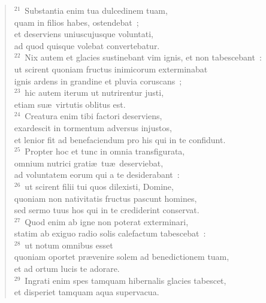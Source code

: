 \begin{flushleft}
\begin{verse}
${}^{21}$~Substantia enim tua dulcedinem tuam,\\ quam in filios habes, ostendebat~;\\ et deserviens uniuscujusque voluntati,\\ ad quod quisque volebat convertebatur.\\
${}^{22}$~Nix autem et glacies sustinebant vim ignis, et non tabescebant~:\\ ut scirent quoniam fructus inimicorum exterminabat\\ ignis ardens in grandine et pluvia coruscans~;\\
${}^{23}$~hic autem iterum ut nutrirentur justi,\\ etiam su\ae\ virtutis oblitus est.\\
${}^{24}$~Creatura enim tibi factori deserviens,\\ exardescit in tormentum adversus injustos,\\ et lenior fit ad benefaciendum pro his qui in te confidunt.\\
${}^{25}$~Propter hoc et tunc in omnia transfigurata,\\ omnium nutrici grati\ae\ tu\ae\ deserviebat,\\ ad voluntatem eorum qui a te desiderabant~:\\
${}^{26}$~ut scirent filii tui quos dilexisti, Domine,\\ quoniam non nativitatis fructus pascunt homines,\\ sed sermo tuus hos qui in te crediderint conservat.\\
${}^{27}$~Quod enim ab igne non poterat exterminari,\\ statim ab exiguo radio solis calefactum tabescebat~:\\
${}^{28}$~ut notum omnibus esset\\ quoniam oportet pr\ae venire solem ad benedictionem tuam,\\ et ad ortum lucis te adorare.\\
${}^{29}$~Ingrati enim spes tamquam hibernalis glacies tabescet,\\ et disperiet tamquam aqua supervacua.\end{verse}\end{flushleft}


